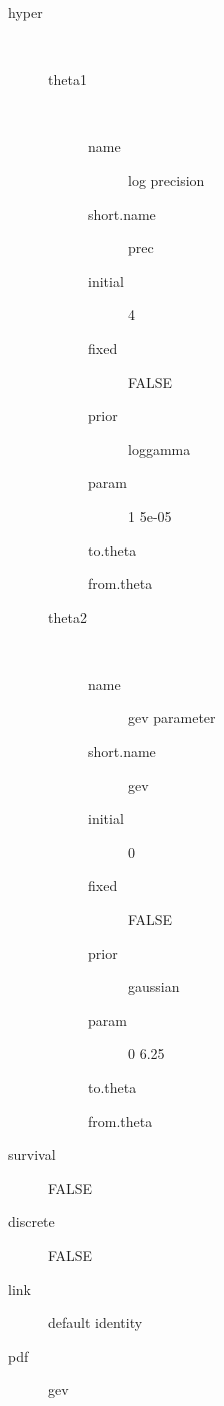 \begin{description}
	\item[hyper]\ 
	 \begin{description}
	 	\item[theta1]\ 
	 	 \begin{description}
	 	 	 \item[ name ] log precision 
	 	 	 \item[ short.name ] prec 
	 	 	 \item[ initial ] 4 
	 	 	 \item[ fixed ] FALSE 
	 	 	 \item[ prior ] loggamma 
	 	 	 \item[ param ] 1 5e-05 
	 	 	 \item[ to.theta ] \verb|| 
	 	 	 \item[ from.theta ] \verb|| 
	 	 \end{description}
	 	\item[theta2]\ 
	 	 \begin{description}
	 	 	 \item[ name ] gev parameter 
	 	 	 \item[ short.name ] gev 
	 	 	 \item[ initial ] 0 
	 	 	 \item[ fixed ] FALSE 
	 	 	 \item[ prior ] gaussian 
	 	 	 \item[ param ] 0 6.25 
	 	 	 \item[ to.theta ] \verb|| 
	 	 	 \item[ from.theta ] \verb|| 
	 	 \end{description}
	 \end{description}
	 \item[ survival ] FALSE 
	 \item[ discrete ] FALSE 
	 \item[ link ] default identity 
	 \item[ pdf ] gev 
\end{description}

